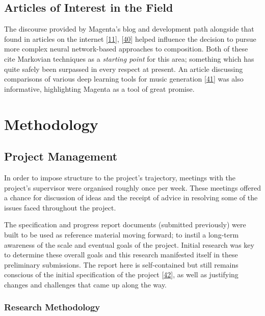 \documentclass[12pt,]{article}
\begin{document}
\hypertarget{articles-of-interest-in-the-field}{%
\subsection{Articles of Interest in the
Field}\label{articles-of-interest-in-the-field}}

The discourse provided by Magenta's blog and development path alongside
that found in articles on the internet
{[}\protect\hyperlink{ref-mediumkylemcdonald}{11}{]},
{[}\protect\hyperlink{ref-mkofler}{40}{]} helped influence the decision
to pursue more complex neural network-based approaches to composition.
Both of these cite Markovian techniques as a \emph{starting point} for
this area; something which has quite safely been surpassed in every
respect at present. An article discussing comparisons of various deep
learning tools for music generation
{[}\protect\hyperlink{ref-asimovinst}{41}{]} was also informative,
highlighting Magenta as a tool of great promise.

\hypertarget{methodology}{%
\section{Methodology}\label{methodology}}

\hypertarget{project-management}{%
\subsection{Project Management}\label{project-management}}

In order to impose structure to the project's trajectory, meetings with
the project's supervisor were organised roughly once per week. These
meetings offered a chance for discussion of ideas and the receipt of
advice in resolving some of the issues faced throughout the project.

The specification and progress report documents (submitted previously)
were built to be used as reference material moving forward; to instil a
long-term awareness of the scale and eventual goals of the project.
Initial research was key to determine these overall goals and this
research manifested itself in these preliminary submissions. The report
here is self-contained but still remains conscious of the initial
specification of the project
{[}\protect\hyperlink{ref-specification}{42}{]}, as well as justifying
changes and challenges that came up along the way.

\hypertarget{research-methodology}{%
\subsubsection{Research Methodology}\label{research-methodology}}
\end{document}
